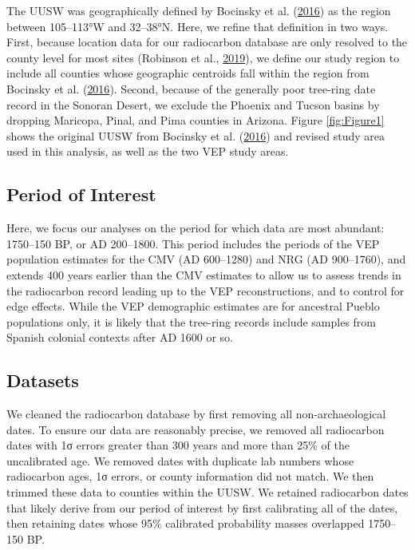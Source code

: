\documentclass[
]{sa}
\begin{document}
The UUSW was geographically defined by Bocinsky et al. (\protect\hyperlink{ref-Bocinsky2016}{2016}) as the region between 105--113°W and 32--38°N. Here, we refine that definition in two ways. First, because location data for our radiocarbon database are only resolved to the county level for most sites (Robinson et al., \protect\hyperlink{ref-Robinson2019}{2019}), we define our study region to include all counties whose geographic centroids fall within the region from Bocinsky et al. (\protect\hyperlink{ref-Bocinsky2016}{2016}). Second, because of the generally poor tree-ring date record in the Sonoran Desert, we exclude the Phoenix and Tucson basins by dropping Maricopa, Pinal, and Pima counties in Arizona. Figure \ref{fig:Figure1} shows the original UUSW from Bocinsky et al. (\protect\hyperlink{ref-Bocinsky2016}{2016}) and revised study area used in this analysis, as well as the two VEP study areas.

\hypertarget{period-of-interest}{%
\subsection*{Period of Interest}\label{period-of-interest}}

Here, we focus our analyses on the period for which data are most abundant: 1750--150 BP, or AD 200--1800. This period includes the periods of the VEP population estimates for the CMV (AD 600--1280) and NRG (AD 900--1760), and extends 400 years earlier than the CMV estimates to allow us to assess trends in the radiocarbon record leading up to the VEP reconstructions, and to control for edge effects. While the VEP demographic estimates are for ancestral Pueblo populations only, it is likely that the tree-ring records include samples from Spanish colonial contexts after AD 1600 or so.

\hypertarget{datasets}{%
\subsection*{Datasets}\label{datasets}}

We cleaned the radiocarbon database by first removing all non-archaeological dates. To ensure our data are reasonably precise, we removed all radiocarbon dates with 1σ errors greater than 300 years and more than 25\% of the uncalibrated age. We removed dates with duplicate lab numbers whose radiocarbon ages, 1σ errors, or county information did not match. We then trimmed these data to counties within the UUSW. We retained radiocarbon dates that likely derive from our period of interest by first calibrating all of the dates, then retaining dates whose 95\% calibrated probability masses overlapped 1750--150 BP.
\end{document}
